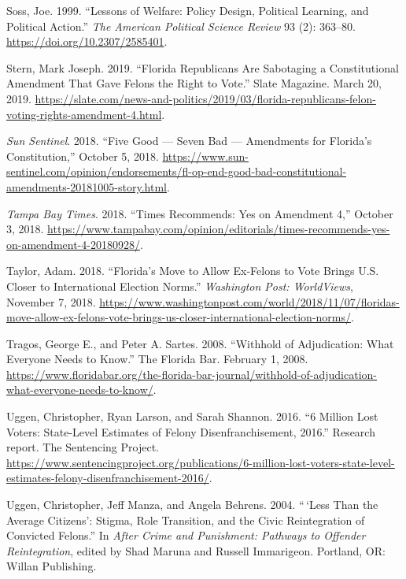 \documentclass[
  12pt,
]{article}
\newlength{\cslhangindent}
\newenvironment{cslreferences}%
  {\setlength{\parindent}{0pt}%
  \everypar{\setlength{\hangindent}{\cslhangindent}}\ignorespaces}%
  {\par}
\begin{document}
\begin{cslreferences}
\leavevmode\hypertarget{ref-Soss1999}{}%
Soss, Joe. 1999. ``Lessons of Welfare: Policy Design, Political Learning, and Political Action.'' \emph{The American Political Science Review} 93 (2): 363--80. \url{https://doi.org/10.2307/2585401}.

\leavevmode\hypertarget{ref-Stern2019}{}%
Stern, Mark Joseph. 2019. ``Florida Republicans Are Sabotaging a Constitutional Amendment That Gave Felons the Right to Vote.'' Slate Magazine. March 20, 2019. \url{https://slate.com/news-and-politics/2019/03/florida-republicans-felon-voting-rights-amendment-4.html}.

\leavevmode\hypertarget{ref-SunSentinelEditorial2018}{}%
\emph{Sun Sentinel}. 2018. ``Five Good --- Seven Bad --- Amendments for Florida's Constitution,'' October 5, 2018. \url{https://www.sun-sentinel.com/opinion/endorsements/fl-op-end-good-bad-constitutional-amendments-20181005-story.html}.

\leavevmode\hypertarget{ref-tampabaytimes2018}{}%
\emph{Tampa Bay Times}. 2018. ``Times Recommends: Yes on Amendment 4,'' October 3, 2018. \url{https://www.tampabay.com/opinion/editorials/times-recommends-yes-on-amendment-4-20180928/}.

\leavevmode\hypertarget{ref-Taylor2018}{}%
Taylor, Adam. 2018. ``Florida's Move to Allow Ex-Felons to Vote Brings U.S. Closer to International Election Norms.'' \emph{Washington Post: WorldViews}, November 7, 2018. \url{https://www.washingtonpost.com/world/2018/11/07/floridas-move-allow-ex-felons-vote-brings-us-closer-international-election-norms/}.

\leavevmode\hypertarget{ref-Tragos2008}{}%
Tragos, George E., and Peter A. Sartes. 2008. ``Withhold of Adjudication: What Everyone Needs to Know.'' The Florida Bar. February 1, 2008. \url{https://www.floridabar.org/the-florida-bar-journal/withhold-of-adjudication-what-everyone-needs-to-know/}.

\leavevmode\hypertarget{ref-sentencing_2016}{}%
Uggen, Christopher, Ryan Larson, and Sarah Shannon. 2016. ``6 Million Lost Voters: State-Level Estimates of Felony Disenfranchisement, 2016.'' Research report. The Sentencing Project. \url{https://www.sentencingproject.org/publications/6-million-lost-voters-state-level-estimates-felony-disenfranchisement-2016/}.

\leavevmode\hypertarget{ref-Uggen2004a}{}%
Uggen, Christopher, Jeff Manza, and Angela Behrens. 2004. ``\,`Less Than the Average Citizens': Stigma, Role Transition, and the Civic Reintegration of Convicted Felons.'' In \emph{After Crime and Punishment: Pathways to Offender Reintegration}, edited by Shad Maruna and Russell Immarigeon. Portland, OR: Willan Publishing.


\end{cslreferences}
\end{document}
